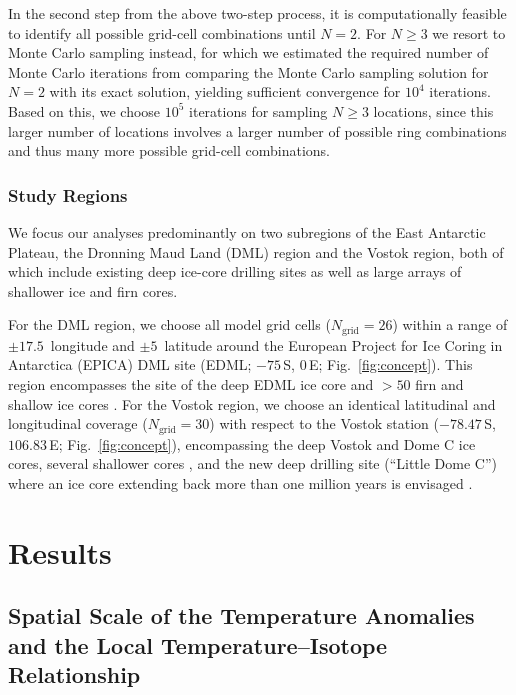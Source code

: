 \documentclass[draft]{agujournal2019}
\begin{document}
In the second step from the above two-step process, it is computationally
feasible to identify all possible grid-cell combinations until $N=2$. For
$N\geq3$ we resort to Monte Carlo sampling instead, for which we estimated the
required number of Monte Carlo iterations from comparing the Monte Carlo
sampling solution for $N=2$ with its exact solution, yielding sufficient
convergence for $10^4$ iterations. Based on this, we choose $10^5$ iterations
for sampling $N\geq3$ locations, since this larger number of locations involves
a larger number of possible ring combinations and thus many more possible
grid-cell combinations.

\subsubsection{Study Regions}\label{methods:regions}

We focus our analyses predominantly on two subregions of the East Antarctic
Plateau, the Dronning Maud Land (DML) region and the Vostok region, both of
which include existing deep ice-core drilling sites as well as large arrays of
shallower ice and firn cores.

For the DML region, we choose all model grid cells ($N_{\mathrm{grid}}=26$)
within a range of $\pm17.5$\textdegree\ longitude and $\pm5$\textdegree\
latitude around the European Project for Ice Coring in Antarctica (EPICA) DML
site (EDML; $-75$\textdegree\,S, $0$\textdegree\,E;
Fig.~\ref{fig:concept}). This region encompasses the site of the deep EDML ice
core \cite{EPICAcommunitymembers2006,awi2016} and $>50$ firn and shallow ice
cores \cite{Altnau2015}. For the Vostok region, we choose an identical
latitudinal and longitudinal coverage ($N_{\mathrm{grid}}=30$) with respect to
the Vostok station ($-78.47$\textdegree\,S, $106.83$\textdegree\,E;
Fig.~\ref{fig:concept}), encompassing the deep Vostok and Dome C ice cores,
several shallower cores \cite{Stenni2017}, and the new deep drilling site
(``Little Dome C'') where an ice core extending back more than one million years
is envisaged \cite{Passalacqua2018}.

\section{Results}\label{results}

\subsection{Spatial Scale of the Temperature Anomalies and the Local
  Temperature--Isotope Relationship}
\label{results:t2m-iso}
\end{document}

